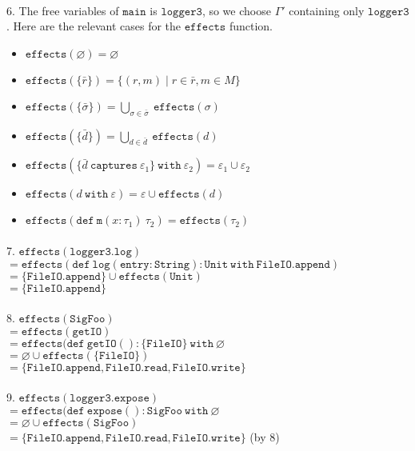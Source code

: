 \documentclass{llncs}
\newcommand{\keywadj}[1]{\mathtt{#1}}
\newcommand{\keyw}[1]{\keywadj{#1}~}
\begin{document}
\paragraph{}
6. The free variables of $\keywadj{main}$ is $\keywadj{logger3}$, so we choose $\Gamma'$ containing only $\keywadj{logger3}$. Here are the relevant cases for the $\keywadj{effects}$ function.
\begin{itemize}
	\item $\keywadj{effects}(\varnothing) = \varnothing$
	\item $\keywadj{effects}(\{\bar r\}) = \{ (r, m) \mid r \in \bar r, m \in M \}$
	\item $\keywadj{effects}(\{\bar \sigma\}) = \bigcup_{\sigma \in \bar \sigma}~\keywadj{effects}(\sigma)$
	\item $\keywadj{effects}(\{\bar d\}) = \bigcup_{d \in \bar d}~\keywadj{effects}(d)$
	\item $\keywadj{effects}(\{ \bar d~\keyw{captures} \varepsilon_1 \}~\keyw{with} \varepsilon_2) = \varepsilon_1 \cup \varepsilon_2$
	\item $\keywadj{effects}(d~\keyw{with} \varepsilon) = \varepsilon \cup \keywadj{effects}(d)$
	\item $\keywadj{effects}(\keywadj{def~m}(x : \tau_1)~\tau_2) = \keywadj{effects}(\tau_2)$
\end{itemize}

\paragraph{}
7. $\keywadj{effects(logger3.log)}$\\
$\keywadj{= effects(def~log (entry : String) : Unit~with~FileIO.append)}$\\
$\keywadj{= \{ FileIO.append \} \cup effects(Unit)}$\\
$\keywadj{= \{ FileIO.append \}}$

\paragraph{}
8. $\keywadj{effects(SigFoo)}$\\
$\keywadj{= effects(getIO)}$\\
$\keywadj{= effects(def~getIO() : \{ FileIO \}~with~\varnothing}$\\
$\keywadj{= \varnothing \cup effects(\{FileIO\})}$\\
$\keywadj{= \{ FileIO.append, FileIO.read, FileIO.write \}}$

\paragraph{}
9. $\keywadj{effects(logger3.expose)}$\\
$\keywadj{= effects(def~expose() : SigFoo~with~\varnothing}$\\
$\keywadj{= \varnothing \cup effects(SigFoo)}$\\
$\keywadj{= \{ FileIO.append, FileIO.read, FileIO.write \}}$ (by 8)
\end{document}
